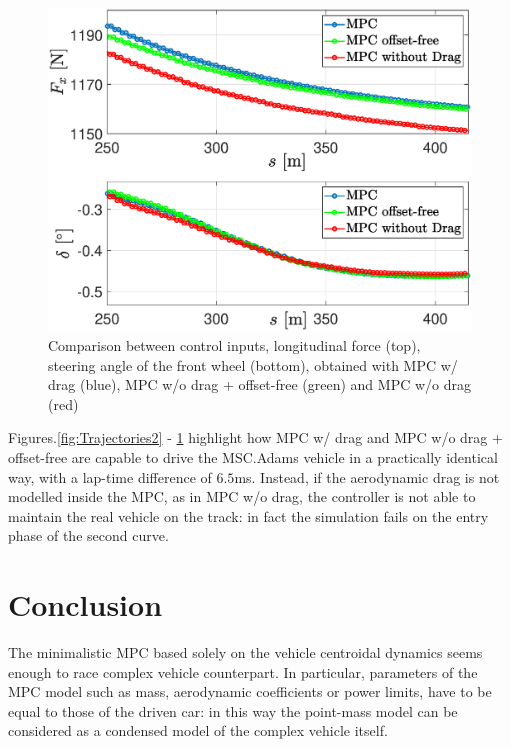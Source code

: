 \documentclass[conference]{IEEEtran} %
\begin{document}
\begin{figure}[htb] \centering
	\includegraphics[width=1.\linewidth]{steer_fx} %
	\caption{Comparison between control inputs, longitudinal force (top), steering angle of the front wheel (bottom), obtained with MPC w/ drag (blue), MPC w/o drag + offset-free (green) and MPC w/o drag (red)}
	\label{fig:steer_fx}
\end{figure}

Figures.\ref{fig:Trajectories2} - \ref{fig:steer_fx} highlight how MPC w/ drag and MPC w/o drag + offset-free are capable to drive the MSC.Adams vehicle in a practically identical way, with a lap-time difference of $6.5$ms. Instead, if the aerodynamic drag is not modelled inside the MPC, as in MPC w/o drag, the controller is not able to maintain the real vehicle on the track: in fact the simulation fails on the entry phase of the second curve.



\section{Conclusion}
The minimalistic MPC based solely on the vehicle centroidal dynamics seems enough to race complex vehicle counterpart.
In particular, parameters of the MPC model such as mass, aerodynamic coefficients or power limits, have to be equal to those of the driven car: in this way the point-mass model can be considered as a condensed model of the complex vehicle itself.
\end{document}
